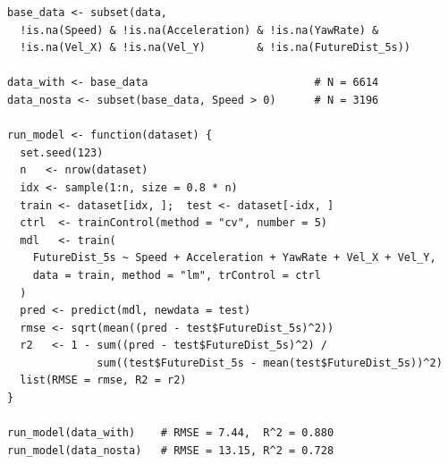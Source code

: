 \documentclass[conference]{IEEEtran}
\begin{document}
\begin{lstlisting}[style=Rstyle, caption={Linear regression for 5-second displacement prediction.}, label={lst:regression}]
base_data <- subset(data,
  !is.na(Speed) & !is.na(Acceleration) & !is.na(YawRate) &
  !is.na(Vel_X) & !is.na(Vel_Y)        & !is.na(FutureDist_5s))

data_with <- base_data                          # N = 6614
data_nosta <- subset(base_data, Speed > 0)      # N = 3196

run_model <- function(dataset) {
  set.seed(123)
  n   <- nrow(dataset)
  idx <- sample(1:n, size = 0.8 * n)
  train <- dataset[idx, ];  test <- dataset[-idx, ]
  ctrl  <- trainControl(method = "cv", number = 5)
  mdl   <- train(
    FutureDist_5s ~ Speed + Acceleration + YawRate + Vel_X + Vel_Y,
    data = train, method = "lm", trControl = ctrl
  )
  pred <- predict(mdl, newdata = test)
  rmse <- sqrt(mean((pred - test$FutureDist_5s)^2))
  r2   <- 1 - sum((pred - test$FutureDist_5s)^2) /
              sum((test$FutureDist_5s - mean(test$FutureDist_5s))^2)
  list(RMSE = rmse, R2 = r2)
}

run_model(data_with)    # RMSE = 7.44,  R^2 = 0.880
run_model(data_nosta)   # RMSE = 13.15, R^2 = 0.728
\end{lstlisting}



\end{document}
